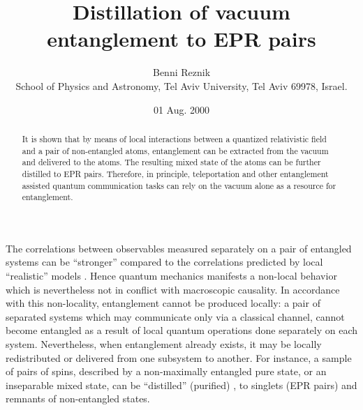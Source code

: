 

\newcommand{\beq}{\begin{equation}}
\newcommand{\eeq}{\end{equation}}
\newcommand{\beqa}{\begin{eqnarray}}
\newcommand{\eeqa}{\end{eqnarray}}
\newcommand{\beqar}{\begin{eqnarray*}}
\newcommand{\eeqar}{\end{eqnarray*}}

\def \la {\langle}
\def \ra {\rangle}
\def \up {\uparrow}
\def \down {\downarrow}




\title{  Distillation of vacuum entanglement to EPR pairs    }
\author{ {\large Benni Reznik} \\
 { School of Physics and Astronomy, Tel Aviv
                      University, Tel Aviv 69978, Israel.}   }
\date{01 Aug. 2000}
\maketitle

\begin{abstract}
It is  shown that by means of local interactions between a
quantized relativistic field and a pair of non-entangled atoms,
entanglement can be extracted from the vacuum
and delivered to the atoms.
The resulting mixed state of the atoms can be further
distilled to EPR pairs.
Therefore, in principle, teleportation and other entanglement
assisted quantum communication tasks can rely on the vacuum
alone as a resource for entanglement.

\end{abstract}



The correlations between observables measured separately on a pair
of entangled systems can be ``stronger''  compared to the
correlations predicted by  local ``realistic'' models \cite{bell}.
Hence quantum mechanics manifests a non-local behavior which is
nevertheless not in conflict with macroscopic causality. In
accordance with this non-locality, entanglement cannot be produced
locally: a pair of separated systems which may communicate only via
a classical channel, cannot become entangled
as a result of local quantum operations done separately on each system.
Nevertheless, when  entanglement already exists, it may be locally
redistributed or delivered from one subsystem to another. For
instance, a sample of pairs of spins, described by a
non-maximally entangled pure state, or an
inseparable\cite{ins} mixed state, can be
``distilled'' (purified) \cite{concentration,purification}, to singlets (EPR pairs)
and remnants of non-entangled states.


